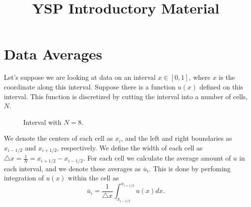 \documentclass[10.5pt]{article}
\begin{document}
\title{YSP Introductory Material}
\maketitle

    \section{Data Averages}
    Let's suppose we are looking at data on an interval $x \in [0,1]$, where
    $x$ is the coordinate along this interval. Suppose there is a function
    $u(x)$ defined on this interval. This function is discretized by cutting the
    interval into a number of cells, $N$.
    \begin{figure}[H]
        \center
        
        \caption{Interval with $N=8$.}
    \end{figure}
    We denote the centers of each cell as $x_{i}$, and the left and right
    boundaries as $x_{i-1/2}$ and $x_{i+1/2}$, respectively.  We define the
    width of each cell as $\triangle x = \frac{1}{N} = x_{i+1/2} - x_{i-1/2}$. For each cell we
    calculate the average amount of $u$ in each interval, and we denote these
    averages as $\overline{u}_{i}$. This is done by perfoming integration of
    $u(x)$ within the cell as
    \begin{equation}
        \overline{u}_{i} = \frac{1}{\triangle x} \int_{x_{i-1/2}}^{x_{i+1/2}}
        u(x) dx.
    \end{equation}

\end{document}

